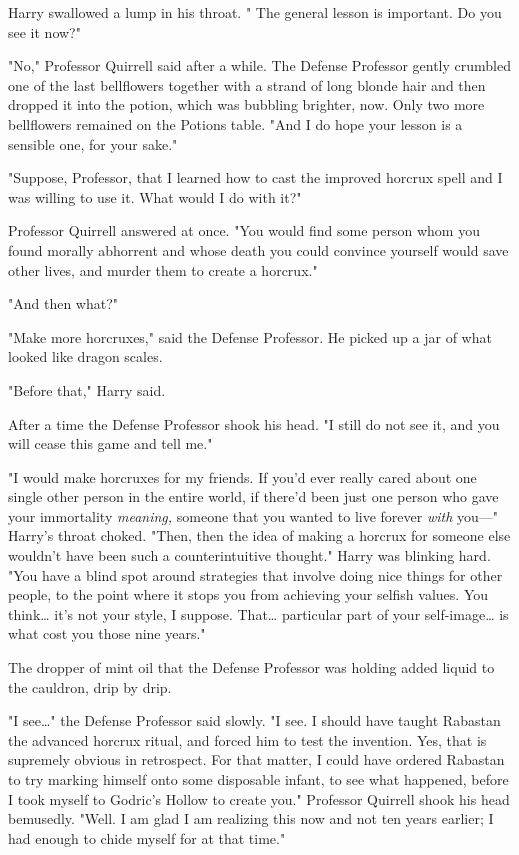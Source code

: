 Harry swallowed a lump in his throat. " The general lesson is important. Do you 
see it now?"

"No," Professor Quirrell said after a while. The Defense Professor gently 
crumbled one of the last bellflowers together with a strand of long blonde hair 
and then dropped it into the potion, which was bubbling brighter, now. Only two 
more bellflowers remained on the Potions table. "And I do hope your lesson is a 
sensible one, for your sake."

"Suppose, Professor, that I learned how to cast the improved horcrux spell and 
I was willing to use it. What would I do with it?"

Professor Quirrell answered at once. "You would find some person whom you found 
morally abhorrent and whose death you could convince yourself would save other 
lives, and murder them to create a horcrux."

"And then what?"

"Make more horcruxes," said the Defense Professor. He picked up a jar of what 
looked like dragon scales.

"Before that," Harry said.

After a time the Defense Professor shook his head. "I still do not see it, and 
you will cease this game and tell me."

"I would make horcruxes for my friends. If you'd ever really cared about one 
single other person in the entire world, if there'd been just one person who 
gave your immortality \emph{meaning,} someone that you wanted to live forever 
\emph{with} you---" Harry's throat choked. "Then, then the idea of making a 
horcrux for someone else wouldn't have been such a counterintuitive thought." 
Harry was blinking hard. "You have a blind spot around strategies that involve 
doing nice things for other people, to the point where it stops you from 
achieving your selfish values. You think{\ldots} it's not your style, I 
suppose. That{\ldots} particular part of your self-image{\ldots} is what cost 
you those nine years."

The dropper of mint oil that the Defense Professor was holding added liquid to 
the cauldron, drip by drip.

"I see{\ldots}" the Defense Professor said slowly. "I see. I should have taught 
Rabastan the advanced horcrux ritual, and forced him to test the invention. 
Yes, that is supremely obvious in retrospect. For that matter, I could have 
ordered Rabastan to try marking himself onto some disposable infant, to see 
what happened, before I took myself to Godric's Hollow to create you." 
Professor Quirrell shook his head bemusedly. "Well. I am glad I am realizing 
this now and not ten years earlier; I had enough to chide myself for at that 
time."

